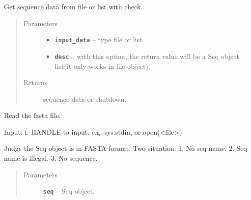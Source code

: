 \documentclass[letterpaper,10pt,english]{sphinxmanual}
\begin{document}

\begin{fulllineitems}
\label{reference/PyPretreatDNA:PyPretreatDNA.GetData}
Get sequence data from file or list with check.
\begin{quote}\begin{description}
\item[{Parameters}] \leavevmode\begin{itemize}
\item {} 
\textbf{\texttt{input\_data}} -- type file or list

\item {} 
\textbf{\texttt{desc}} -- with this option, the return value will be a Seq object list(it only works in file object).

\end{itemize}

\item[{Returns}] \leavevmode
sequence data or shutdown.

\end{description}\end{quote}

\end{fulllineitems}


\begin{fulllineitems}
\label{reference/PyPretreatDNA:PyPretreatDNA.GetSequenceCheckDna}
Read the fasta file.

Input: f: HANDLE to input. e.g. sys.stdin, or open(\textless{}file\textgreater{})

\end{fulllineitems}


\begin{fulllineitems}
\label{reference/PyPretreatDNA:PyPretreatDNA.IsFasta}
Judge the Seq object is in FASTA format.
Two situation:
1. No seq name.
2. Seq name is illegal.
3. No sequence.
\begin{quote}\begin{description}
\item[{Parameters}] \leavevmode
\textbf{\texttt{seq}} -- Seq object.

\end{description}\end{quote}

\end{fulllineitems}
\end{document}
